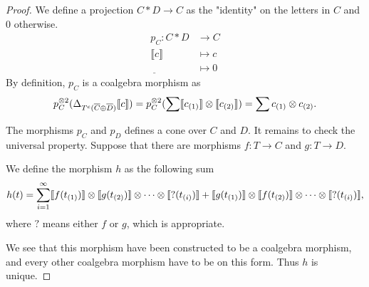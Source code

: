 \documentclass[../thesis.tex]{subfiles}
\begin{document}
                \begin{proof}
                    We define a projection $C\ast D \rightarrow C$ as the "identity" on the letters in $C$ and $0$ otherwise.
                    \begin{align*}
                        p_C : C\ast D & \rightarrow C \\
                        \llbracket c \rrbracket & \mapsto c \\
                        \underline{\phantom{A}} & \mapsto 0
                    \end{align*}
                    By definition, $p_C$ is a coalgebra morphism as 
                    \begin{align*}
                        p_C^{\otimes 2}(\Delta_{T^c(\overline{C}\oplus \overline{D})}\llbracket c \rrbracket) 
                        = p_C^{\otimes 2}(\sum \llbracket c_{(1)} \rrbracket \otimes \llbracket c_{(2)}\rrbracket)
                        = \sum c_{(1)} \otimes c_{(2)}\tt{.}
                    \end{align*}

                    The morphisms $p_C$ and $p_D$ defines a cone over $C$ and $D$. It remains to check the universal property. Suppose that there are morphisms $f : T \rightarrow C$ and $g : T \rightarrow D$.
                    \begin{center}
                    \end{center}

                    We define the morphism $h$ as the following sum
                    \begin{align*}
                        h(t) = \sum_{i=1}^\infty \llbracket f(t_{(1)}) \rrbracket \otimes \llbracket g(t_{(2)}) \rrbracket \otimes \cdots \otimes \llbracket ?(t_{(i)}) \rrbracket + \llbracket g(t_{(1)}) \rrbracket \otimes \llbracket f(t_{(2)}) \rrbracket \otimes \cdots \otimes \llbracket ?(t_{(i)}) \rrbracket\tt{,}
                    \end{align*}
                    where $?$ means either $f$ or $g$, which is appropriate.

                    We see that this morphism have been constructed to be a coalgebra morphism, and every other coalgebra morphism have to be on this form. Thus $h$ is unique.
                \end{proof}
\end{document}
